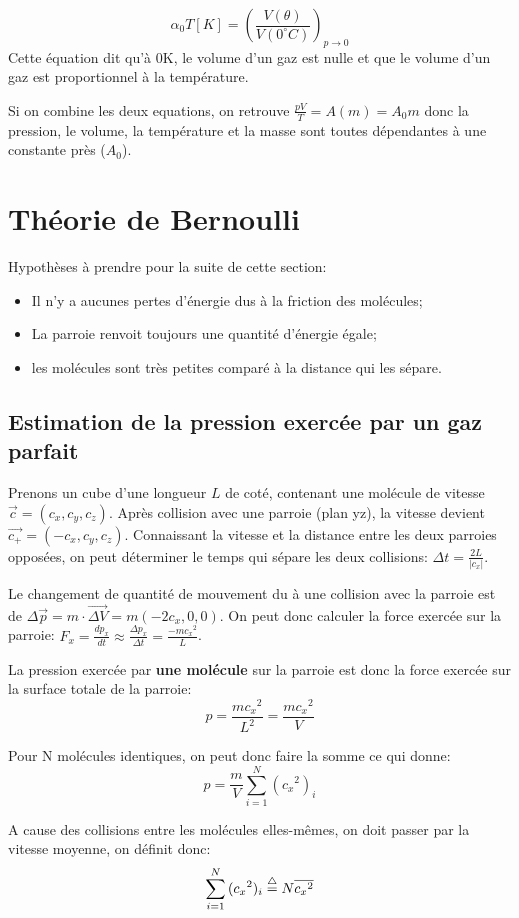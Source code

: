 $$\alpha_0 T[K] = (\frac{V(\theta)}{V(0^\circ C)})_{p \rightarrow 0}$$
Cette équation dit qu'à 0K, le volume d'un gaz est nulle et que le volume d'un gaz est proportionnel à la température.

Si on combine les deux equations, on retrouve $\frac{pV}{T} = A(m) = A_0 m$ donc la pression, le volume, la température et la masse sont toutes dépendantes à une constante près ($A_0$).

\section{Théorie de Bernoulli}
Hypothèses à prendre pour la suite de cette section:
\begin{itemize}
 \item Il n'y a aucunes pertes d'énergie dus à la friction des molécules;
 \item La parroie renvoit toujours une quantité d'énergie égale;
 \item les molécules sont très petites comparé à la distance qui les sépare.
\end{itemize}

\subsection{Estimation de la pression exercée par un gaz parfait}
Prenons un cube d'une longueur $L$ de coté, contenant une molécule de vitesse $\vec{c} = (c_x, c_y, c_z)$. Après collision avec une parroie (plan yz), la vitesse devient $\vec{c_+} = (-c_x, c_y, c_z)$.
Connaissant la vitesse et la distance entre les deux parroies opposées, on peut déterminer le temps qui sépare les deux collisions: $\Delta t = \frac{2L}{|c_x|}$.

Le changement de quantité de mouvement du à une collision avec la parroie est de $\Delta \vec{p} = m \cdot \vec{\Delta V} = m(-2c_x, 0, 0)$. On peut donc calculer la force exercée sur la parroie: $F_x = \frac{dp_x}{dt} \approx \frac{\Delta p_x}{\Delta t} = \frac{-m{c_x}^2}{L}$.

La pression exercée par {\bf une molécule} sur la parroie est donc la force exercée sur la surface totale de la parroie: $$p = \frac{m{c_x}^2}{L^2} = \frac{m{c_x}^2}{V}$$

Pour N molécules identiques, on peut donc faire la somme ce qui donne:
$$p = \frac{m}{V} \sum_{i=1}^{N}{({c_x}^2)_i}$$

A cause des collisions entre les molécules elles-mêmes, on doit passer par la vitesse moyenne, on définit donc: $$ \sum_{i=1}^{N}{({c_x}^2)_i} \buildrel\triangle\over = N \overline{{c_x}^2}$$ 


